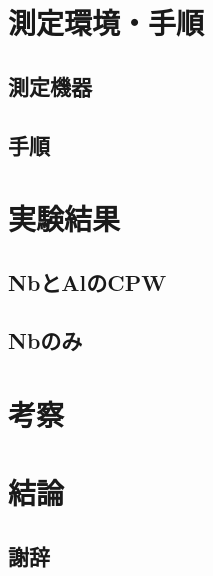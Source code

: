 \documentclass[a4paper,11pt,oneside,openany]{jsbook}
\begin{document}
\chapter{測定環境・手順}
\section{測定機器}
\section{手順}

\chapter{実験結果}
\section{NbとAlのCPW}
\section{Nbのみ}

\chapter{考察}


\chapter{結論}
\section*{謝辞}
%
\begin{thebibliography}{99}
\end{thebibliography}
%
\end{document}

